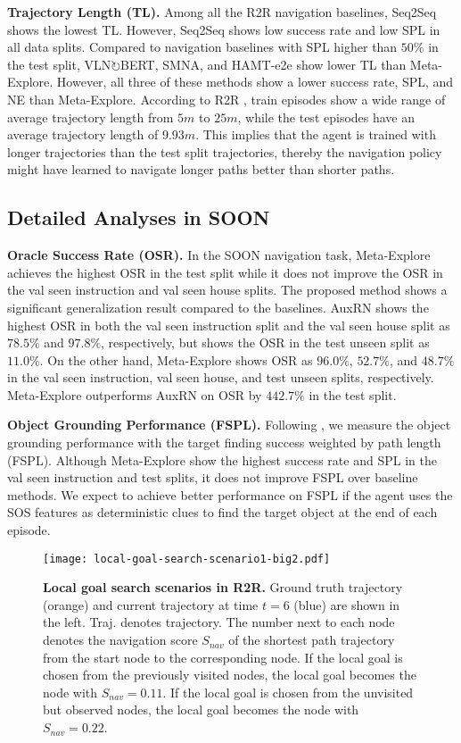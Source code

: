 \documentclass[10pt,twocolumn,letterpaper]{article}
\begin{document}
\noindent\textbf{Trajectory Length (TL).}
Among all the R2R navigation baselines, Seq2Seq shows the lowest TL. However, Seq2Seq shows low success rate and low SPL in all data splits. Compared to navigation baselines with SPL higher than $50\%$ in the test split, VLN$\circlearrowright$BERT, SMNA, and HAMT-e2e show lower TL than Meta-Explore. However, all three of these methods show a lower success rate, SPL, and NE than Meta-Explore. According to R2R \cite{anderson2018vision}, train episodes show a wide range of average trajectory length from $5m$ to $25m$, while the test episodes have an average trajectory length of $9.93m$. This implies that the agent is trained with longer trajectories than the test split trajectories, thereby the navigation policy might have learned to navigate longer paths better than shorter paths.

\subsection{Detailed Analyses in SOON}
\noindent\textbf{Oracle Success Rate (OSR).}
In the SOON navigation task, Meta-Explore achieves the highest OSR in the test split while it does not improve the OSR in the val seen instruction and val seen house splits. The proposed method shows a significant generalization result compared to the baselines. AuxRN shows the highest OSR in both the val seen instruction split and the val seen house split as $78.5\%$ and $97.8\%$, respectively, but shows the OSR in the test unseen split as $11.0\%$. On the other hand, Meta-Explore shows OSR as $96.0\%$, $52.7\%$, and $48.7\%$ in the val seen instruction, val seen house, and test unseen splits, respectively. Meta-Explore outperforms AuxRN on OSR by $442.7\%$ in the test split. 

\noindent\textbf{Object Grounding Performance (FSPL).} 
Following \cite{zhu2021soon}, we measure the object grounding performance with the target finding success weighted by path length (FSPL). Although Meta-Explore show the highest success rate and SPL in the val seen instruction and test splits, it does not improve FSPL over baseline methods. We expect to achieve better performance on FSPL if the agent uses the SOS features as deterministic clues to find the target object at the end of each episode. 

\begin{figure*}[t!]{\centering\texttt{[image: local-goal-search-scenario1-big2.pdf]}}\centering
\caption{{\textbf{Local goal search scenarios in R2R.} Ground truth trajectory (orange) and current trajectory at time $t=6$ (blue) are shown in the left. Traj. denotes trajectory. The number next to each node denotes the navigation score $S_{nav}$ of the shortest path trajectory from the start node to the corresponding node. If the local goal is chosen from the previously visited nodes, the local goal becomes the node with $S_{nav}=0.11$. If the local goal is chosen from the unvisited but observed nodes, the local goal becomes the node with $S_{nav}=0.22$.
}}\label{fig:local-goal-search-scenario1}
\end{figure*}
\end{document}

